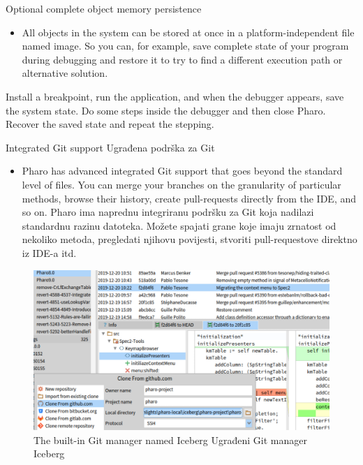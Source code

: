 \documentclass{beamer}
\begin{document}
\begin{frame}{Optional complete object memory persistence}
\begin{itemize}
    \item All objects in the system can be stored at once in a platform-independent file named image. So you can, for example, save complete state of your program during debugging and restore it to try to find a different execution path or alternative solution.
\end{itemize}
\begin{block}{}
Install a breakpoint, run the application, and when the debugger appears, save the system state. Do some steps inside the debugger and then close Pharo. Recover the saved state and repeat the stepping.
\end{block}
\end{frame}

\begin{frame}{Integrated Git support Ugrađena podrška za Git}
\begin{itemize}
    \item Pharo has advanced integrated Git support that goes beyond the standard level of files. You can merge your branches on the granularity of particular methods, browse their history, create pull-requests directly from the IDE, and so on.
    Pharo ima naprednu integriranu podršku za Git koja nadilazi standardnu razinu datoteka. Možete spajati grane koje imaju zrnatost od nekoliko metoda, pregledati njihovu povijesti, stvoriti pull-requestove direktno iz IDE-a itd. 
\end{itemize}
\begin{figure}
    \centering
    \includegraphics[width=0.5\linewidth]{iceberg.png}
    \caption{The built-in Git manager named Iceberg
Ugrađeni Git manager Iceberg}
    \label{fig:iceberg}
\end{figure}
\end{frame}
\end{document}
